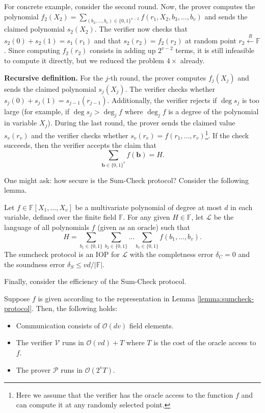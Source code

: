 \documentclass{gkr-template}
\begin{document}
For concrete example, consider the second round. Now, the prover computes the
polynomial $f_2(X_2) = \sum_{(b_3,\dots,b_v) \in \{0,1\}^{v-2}}
f(r_1,X_2,b_3,\dots,b_v)$ and sends the claimed polynomial $s_2(X_2)$. The
verifier now checks that $s_2(0) + s_2(1) = s_1(r_1)$ and that $s_2(r_2) =
f_2(r_2)$ at random point $r_2 \xleftarrow{R} \mathbb{F}$. Since computing
$f_2(r_2)$ consists in adding up $2^{v-2}$ terms, it is still infeasible to
compute it directly, but we reduced the problem $4 \times$ already.

\textbf{Recursive definition.} For the $j$-th round, the prover computes
$f_j(X_j)$ and sends the claimed polynomial $s_j(X_j)$. The verifier checks
whether $s_j(0) + s_j(1) = s_{j-1}(r_{j-1})$. Additionally, the verifier rejects
if $\deg s_j$ is too large (for example, if $\deg s_j > \deg_j f$ where $\deg_j
f$ is a degree of the polynomial in variable $X_j$). During the last round, the
prover sends the claimed value $s_v(r_v)$ and the verifier checks whether
$s_v(r_v) = f(r_1,\dots,r_v)$\footnote{Here we assume that the verifier has the
oracle access to the function $f$ and can compute it at any randomly selected
point.}. If the check succeeds, then the verifier accepts the claim that
\begin{equation*}
    \sum_{\boldsymbol{b} \in \{0,1\}^v} f(\boldsymbol{b}) = H.
\end{equation*}

One might ask: how secure is the Sum-Check protocol? Consider the following 
lemma.
\begin{lemma}\label{lemma:sumcheck-protocol}
    Let $f \in \mathbb{F}[X_1,\dots,X_v]$ be a multivariate polynomial of degree
    at most $d$ in each variable, defined over the finite field $\mathbb{F}$.
    For any given $H \in \mathbb{F}$, let $\mathcal{L}$ be the language of 
    all polynomials $f$ (given as an oracle) such that
    \begin{equation*}
        H = \sum_{b_1 \in \{0,1\}}\sum_{b_2 \in \{0,1\}} \dots \sum_{b_v \in \{0,1\}} f(b_1,\dots,b_v).
    \end{equation*}
    The sumcheck protocol is an IOP for $\mathcal{L}$ with the completness error
    $\delta_C=0$ and the soundness error $\delta_S \leq vd/|\mathbb{F}|$.
\end{lemma}

Finally, consider the efficiency of the Sum-Check protocol.
\begin{lemma}
    Suppose $f$ is given according to the representation in Lemma \ref{lemma:sumcheck-protocol}. Then, the 
    following holds:
    \begin{itemize}
        \item Communication consists of $\mathcal{O}(dv)$ field elements.
        \item The verifier $\mathcal{V}$ runs in $\mathcal{O}(vd)+T$ where $T$
        is the cost of the oracle access to $f$.
        \item The prover $\mathcal{P}$ runs in $\mathcal{O}(2^vT)$.
    \end{itemize}
\end{lemma}
\end{document}
